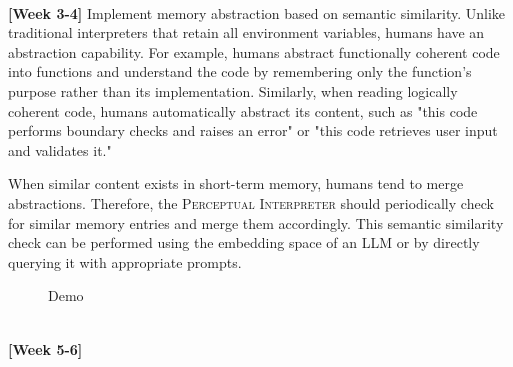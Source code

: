 \documentclass{article}
\begin{document}
\ \\ 
\textbf{[Week 3-4]} Implement memory abstraction based on semantic similarity. Unlike traditional interpreters that retain all environment variables, humans have an abstraction capability. For example, humans abstract functionally coherent code into functions and understand the code by remembering only the function’s purpose rather than its implementation. Similarly, when reading logically coherent code, humans automatically abstract its content, such as "this code performs boundary checks and raises an error" or "this code retrieves user input and validates it."

When similar content exists in short-term memory, humans tend to merge abstractions. Therefore, the \textsc{Perceptual Interpreter} should periodically check for similar memory entries and merge them accordingly. This semantic similarity check can be performed using the embedding space of an LLM or by directly querying it with appropriate prompts.

\begin{figure}[h!]
    \centering
    \caption{Demo}
\end{figure}

\ \\ 
\textbf{[Week 5-6]}
\end{document}
